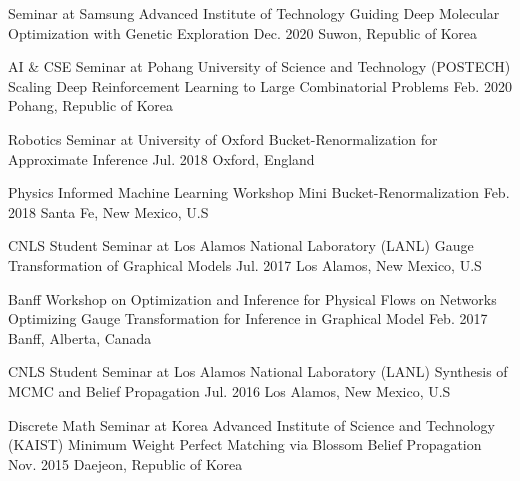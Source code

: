 

\begin{cventries}
    \cventryshort
    {Seminar at Samsung Advanced Institute of Technology}
    {Guiding Deep Molecular Optimization with Genetic Exploration}
    {Dec. 2020}
    {Suwon, Republic of Korea}
    \vspace{.1in}

  \cventryshort
    {AI \& CSE Seminar at Pohang University of Science and Technology (POSTECH)}
    {Scaling Deep Reinforcement Learning to Large Combinatorial Problems}
    {Feb. 2020}
    {Pohang, Republic of Korea}
    \vspace{.1in}

  \cventryshort
    {Robotics Seminar at University of Oxford}
    {Bucket-Renormalization for Approximate Inference}
    {Jul. 2018}
    {Oxford, England}
    \vspace{.1in}
    
  \cventryshort
    {Physics Informed Machine Learning Workshop}
    {Mini Bucket-Renormalization}
    {Feb. 2018}
    {Santa Fe, New Mexico, U.S}
    \vspace{.1in}
    
  \cventryshort
    {CNLS Student Seminar at Los Alamos National Laboratory (LANL)}
    {Gauge Transformation of Graphical Models}
    {Jul. 2017}
    {Los Alamos, New Mexico, U.S}
    \vspace{.1in}

  \cventryshort
    {Banff Workshop on Optimization and Inference for Physical Flows on Networks}
    {Optimizing Gauge Transformation for Inference in Graphical Model}
    {Feb. 2017}
    {Banff, Alberta, Canada}
    \vspace{.1in}

  \cventryshort
    {CNLS Student Seminar at Los Alamos National Laboratory (LANL)}
    {Synthesis of MCMC and Belief Propagation}
    {Jul. 2016}
    {Los Alamos, New Mexico, U.S}
    \vspace{.1in}

  \cventryshort
    {Discrete Math Seminar at Korea Advanced Institute of Science and Technology (KAIST)}
    {Minimum Weight Perfect Matching via Blossom Belief Propagation}
    {Nov. 2015}
    {Daejeon, Republic of Korea}
    \vspace{.1in}
    
\end{cventries}
